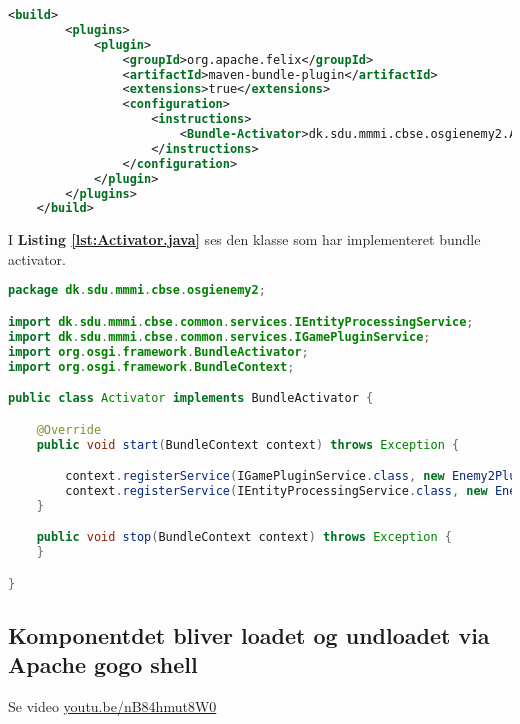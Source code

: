 \begin{lstlisting}[caption={pom.xml}, label={lst:pom-activator}, language=xml]
    <build>
        <plugins>
            <plugin>
                <groupId>org.apache.felix</groupId>
                <artifactId>maven-bundle-plugin</artifactId>
                <extensions>true</extensions>
                <configuration>
                    <instructions>
                        <Bundle-Activator>dk.sdu.mmmi.cbse.osgienemy2.Activator</Bundle-Activator>
                    </instructions>
                </configuration>
            </plugin>
        </plugins>
    </build>
\end{lstlisting}


I \textbf{Listing \ref{lst:Activator.java}} ses den klasse som har implementeret
bundle activator.

\begin{lstlisting}[caption={Activator.java}, label={lst:Activator.java}, language=java]
package dk.sdu.mmmi.cbse.osgienemy2;

import dk.sdu.mmmi.cbse.common.services.IEntityProcessingService;
import dk.sdu.mmmi.cbse.common.services.IGamePluginService;
import org.osgi.framework.BundleActivator;
import org.osgi.framework.BundleContext;

public class Activator implements BundleActivator {

    @Override
    public void start(BundleContext context) throws Exception {

        context.registerService(IGamePluginService.class, new Enemy2Plugin(), null);
        context.registerService(IEntityProcessingService.class, new Enemy2Processor(), null);
    }

    public void stop(BundleContext context) throws Exception {
    }

}
\end{lstlisting}





\subsection{Komponentdet bliver loadet og undloadet via Apache gogo shell}
Se video \href{https://www.youtube.com/watch?v=nB84hmut8W0}{youtu.be/nB84hmut8W0}

